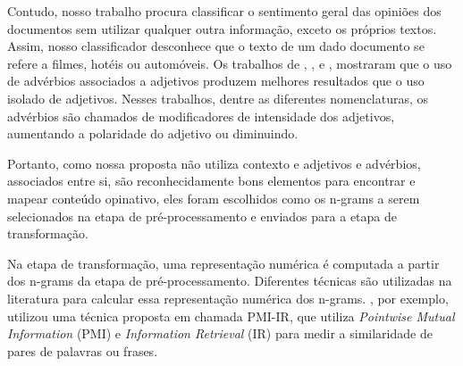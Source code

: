 \documentclass[template.tex]{subfiles}
\begin{document}
Contudo, nosso trabalho procura classificar o sentimento geral das opiniões dos documentos sem utilizar qualquer outra informação, exceto os próprios textos. Assim, nosso classificador desconhece que o texto de um dado documento se refere a filmes, hotéis ou automóveis. Os trabalhos de , ,  e , mostraram que o uso de advérbios associados a adjetivos produzem melhores resultados que o uso isolado de adjetivos. Nesses trabalhos, dentre as diferentes nomenclaturas, os advérbios são chamados de modificadores de intensidade dos adjetivos, aumentando a polaridade do adjetivo ou diminuindo. 

Portanto, como nossa proposta não utiliza contexto e adjetivos e advérbios, associados entre si, são reconhecidamente bons elementos para encontrar e mapear conteúdo opinativo, eles foram escolhidos como os n-grams a serem selecionados na etapa de pré-processamento e enviados para a etapa de transformação.


%
%
%
%
%
%
%
%

Na etapa de transformação, uma representação numérica é computada a partir dos n-grams da etapa de pré-processamento. Diferentes técnicas são utilizadas na literatura para calcular essa representação numérica dos n-grams. , por exemplo, utilizou uma técnica proposta em  chamada PMI-IR, que utiliza \textit{Pointwise Mutual Information} (PMI) e \textit{Information Retrieval} (IR) para medir a similaridade de pares de palavras ou frases. 
\end{document}
